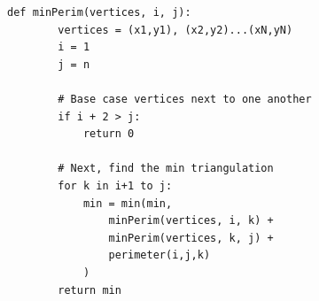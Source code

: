 \documentclass{article}
\begin{document}
\begin{enumerate}[label=(\alph*)]
\begin{lstlisting}[frame=single]
    def minPerim(vertices, i, j):
        vertices = (x1,y1), (x2,y2)...(xN,yN)
        i = 1
        j = n

        # Base case vertices next to one another
        if i + 2 > j: 
            return 0
        
        # Next, find the min triangulation
        for k in i+1 to j:
            min = min(min, 
                minPerim(vertices, i, k) +
                minPerim(vertices, k, j) + 
                perimeter(i,j,k)
            )
        return min
        \end{lstlisting}
\end{enumerate}
\end{document}
